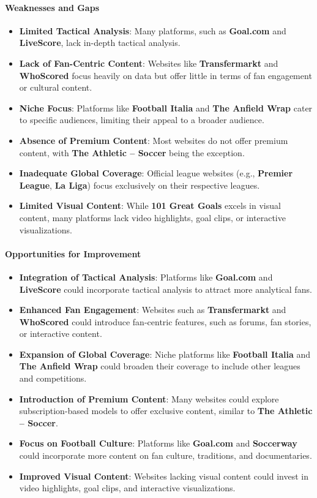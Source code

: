 \paragraph{Weaknesses and Gaps}
\begin{itemize}
    \item \textbf{Limited Tactical Analysis}: Many platforms, such as \textbf{Goal.com} and \textbf{LiveScore}, lack in-depth tactical analysis.
    \item \textbf{Lack of Fan-Centric Content}: Websites like \textbf{Transfermarkt} and \textbf{WhoScored} focus heavily on data but offer little in terms of fan engagement or cultural content.
    \item \textbf{Niche Focus}: Platforms like \textbf{Football Italia} and \textbf{The Anfield Wrap} cater to specific audiences, limiting their appeal to a broader audience.
    \item \textbf{Absence of Premium Content}: Most websites do not offer premium content, with \textbf{The Athletic – Soccer} being the exception.
    \item \textbf{Inadequate Global Coverage}: Official league websites (e.g., \textbf{Premier League}, \textbf{La Liga}) focus exclusively on their respective leagues.
    \item \textbf{Limited Visual Content}: While \textbf{101 Great Goals} excels in visual content, many platforms lack video highlights, goal clips, or interactive visualizations.
\end{itemize}

\paragraph{Opportunities for Improvement}
\begin{itemize}
    \item \textbf{Integration of Tactical Analysis}: Platforms like \textbf{Goal.com} and \textbf{LiveScore} could incorporate tactical analysis to attract more analytical fans.
    \item \textbf{Enhanced Fan Engagement}: Websites such as \textbf{Transfermarkt} and \textbf{WhoScored} could introduce fan-centric features, such as forums, fan stories, or interactive content.
    \item \textbf{Expansion of Global Coverage}: Niche platforms like \textbf{Football Italia} and \textbf{The Anfield Wrap} could broaden their coverage to include other leagues and competitions.
    \item \textbf{Introduction of Premium Content}: Many websites could explore subscription-based models to offer exclusive content, similar to \textbf{The Athletic – Soccer}.
    \item \textbf{Focus on Football Culture}: Platforms like \textbf{Goal.com} and \textbf{Soccerway} could incorporate more content on fan culture, traditions, and documentaries.
    \item \textbf{Improved Visual Content}: Websites lacking visual content could invest in video highlights, goal clips, and interactive visualizations.
\end{itemize}

